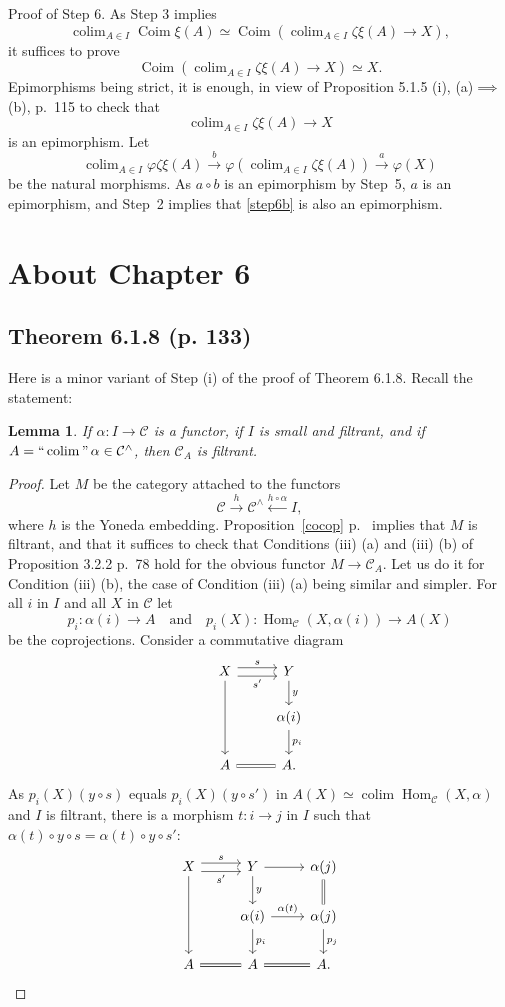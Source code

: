 \documentclass[12pt]{article}
\newtheorem{lem}[thm]{Lemma}
\theoremstyle{remark}
\theoremstyle{definition}
\newcommand{\C}{\mathcal C}
\DeclareMathOperator*{\coli}{colim}
\DeclareMathOperator*{\co}{colim}
\DeclareMathOperator*{\ic}{``\coli"}
\DeclareMathOperator{\Coim}{Coim}
\DeclareMathOperator{\Hom}{Hom}%
\begin{document}
\noindent Proof of Step 6. As Step 3 implies 
$$
\coli_{A\in I}\Coim\xi(A)\simeq\Coim\left(\coli_{A\in I}\zeta\xi(A)\to X\right),
$$ 
it suffices to prove 
%
\begin{equation}\label{step6a}
\Coim\left(\coli_{A\in I}\zeta\xi(A)\to X\right)\simeq X.
\end{equation}
% 
Epimorphisms being strict, it is enough, in view of Proposition 5.1.5 (i), (a)$\implies$(b), p.~115 to check that 
%
\begin{equation}\label{step6b}
\coli_{A\in I}\zeta\xi(A)\to X
\end{equation}
% 
is an epimorphism. Let 
$$
\coli_{A\in I}\varphi\zeta\xi(A)\xrightarrow{b}\varphi\left(\coli_{A\in I}\zeta\xi(A)\right)\xrightarrow{a}\varphi(X)
$$
be the natural morphisms. As $a\circ b$ is an epimorphism by Step~5, $a$ is an epimorphism, and Step~2 implies that \eqref{step6b} is also an epimorphism.
%
%
\section{About Chapter 6}
%
\subsection{Theorem 6.1.8 (p. 133)}
%
Here is a minor variant of Step (i) of the proof of Theorem 6.1.8. Recall the statement: 
%
\begin{lem} 
If $\alpha:I\to\C$ is a functor, if $I$ is small and filtrant, and if $A=\ic\alpha\in\C^\wedge$, then $\C_A$ is filtrant. 
\end{lem} 
%
\begin{proof}
Let $M$ be the category attached to the functors 
$$
\C\xrightarrow h\C^\wedge\xleftarrow{h\circ\alpha}I,
$$ 
where $h$ is the Yoneda embedding. Proposition~\ref{cocop} p.~\pageref{cocop} implies that $M$ is filtrant, and that it suffices to check that Conditions (iii) (a) and (iii) (b) of Proposition 3.2.2 p.~78 hold for the obvious functor $M\to\C_A$. Let us do it for Condition (iii) (b), the case of Condition (iii) (a) being similar and simpler. For all $i$ in $I$ and all $X$ in $\C$ let 
$$
p_i:\alpha(i)\to A\quad\text{and}\quad p_i(X):\Hom_\C(X,\alpha(i))\to A(X)
$$
be the coprojections. Consider a commutative diagram 
$$
\begin{tikzcd}
X\ar{dd}\ar[yshift=0.7ex]{r}{s}\ar[yshift=-0.7ex]{r}[swap]{s'}&Y\ar{d}{y}\\ 
{}&\alpha(i)\ar{d}{p_i}\\ 
A\ar[equal]{r}&A.
\end{tikzcd}
$$ 
As $p_i(X)(y\circ s)$ equals $p_i(X)(y\circ s')$ in $A(X)\simeq\co\Hom_\C(X,\alpha)$ and $I$ is filtrant, there is a morphism $t:i\to j$ in $I$ such that $\alpha(t)\circ y\circ s=\alpha(t)\circ y\circ s'$:
$$
\begin{tikzcd}
X\ar{dd}\ar[yshift=0.7ex]{r}{s}\ar[yshift=-0.7ex]{r}[swap]{s'}&Y\ar{d}{y}\ar{r}&\alpha(j)\ar[equal]{d}\\ 
{}&\alpha(i)\ar{d}{p_i}\ar{r}{\alpha(t)}&\alpha(j)\ar{d}{p_j}\\ 
A\ar[equal]{r}&A\ar[equal]{r}&A.
\end{tikzcd}
$$
\end{proof}
%
%
\end{document}
